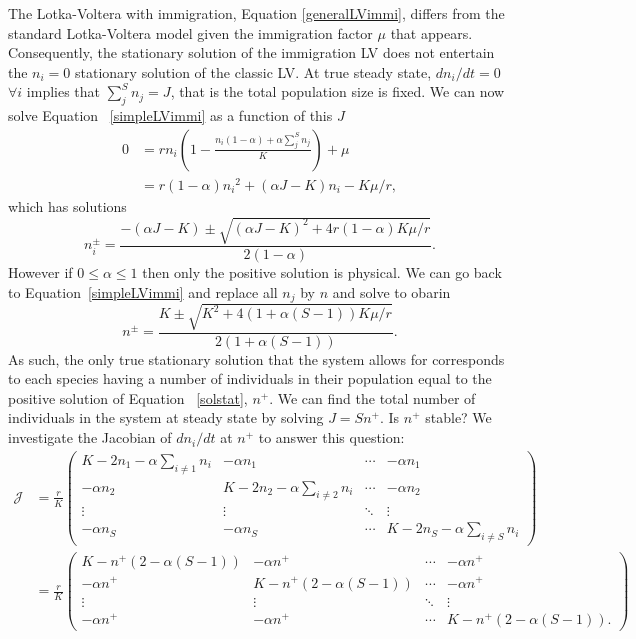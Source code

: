 \documentclass[11pt,a4paper,final]{iopart}
\begin{document}
The Lotka-Voltera with immigration, Equation \ref{generalLVimmi}, differs from the standard Lotka-Voltera model given the immigration factor $\mu$ that appears.
Consequently, the stationary solution of the immigration LV does not entertain the $n_i=0$ stationary solution of the classic LV.
At true steady state, $dn_i/dt=0$ $\forall i$ implies that $\sum_j^S n_j=J$, that is the total population size is fixed.
We can now solve Equation ~\ref{simpleLVimmi} as a function of this $J$
\begin{align*}
0 &= r n_i\left( 1 - \frac{n_i(1-\alpha) + \alpha \sum_{j}^S n_j}{K} \right) + \mu \\
&= r( 1 - \alpha ){n_i}^2 + (\alpha J -K)n_i - K \mu / r,
\end{align*} 
which has solutions
\begin{equation}
n_i^\pm = \frac{-(\alpha J - K) \pm \sqrt{(\alpha J - K)^2 + 4r(1-\alpha)K \mu / r }}{2(1-\alpha )}.
\end{equation}
However if $0\leq \alpha \leq 1$ then only the positive solution is physical.
We can go back to Equation~\ref{simpleLVimmi} and replace all $n_j$ by $n$ and solve to obarin
\begin{equation}\label{solstat}
n^{\pm} = \frac{K \pm \sqrt{K^2 + 4(1 + \alpha (S-1) )K \mu / r }}{2(1 + \alpha (S-1) )}.
\end{equation}
As such, the only true stationary solution that the system allows for corresponds to each species having a number of individuals in their population equal to the positive solution of Equation ~\ref{solstat}, $n^+$.
We can find the total number of individuals in the system at steady state by solving $J=S n^+$.
Is $n^+$ stable? We investigate the Jacobian of $dn_i/dt$ at $n^+$ to answer this question:
\begin{align*}
\mathcal{J} &= \frac{r}{K} \begin{pmatrix}
K - 2 n_1 - \alpha \sum_{i\neq 1} n_i & - \alpha n_1 & \cdots & -\alpha n_1 \\
- \alpha n_2 & K - 2 n_2 - \alpha \sum_{i\neq 2} n_i & \cdots & - \alpha n_2 \\
\vdots & \vdots & \ddots & \vdots \\
- \alpha n_S & - \alpha n_S & \cdots & K - 2 n_S - \alpha \sum_{i\neq S} n_i
\end{pmatrix} \\
&= \frac{r}{K} \begin{pmatrix}
K - n^+ (2 - \alpha (S-1)) & - \alpha n^+ & \cdots & -\alpha n^+ \\
- \alpha n^+ & K - n^+ (2 - \alpha (S-1)) & \cdots & - \alpha n^+ \\
\vdots & \vdots & \ddots & \vdots \\
- \alpha n^+ & - \alpha n^+ & \cdots & K - n^+ (2 - \alpha (S-1)).
\end{pmatrix} 
\end{align*}
\end{document}
